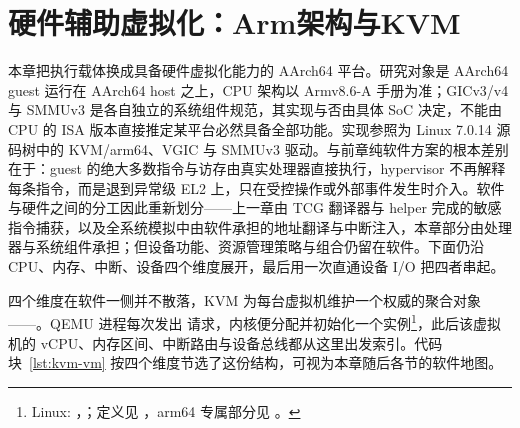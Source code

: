 \chapter{硬件辅助虚拟化：Arm架构与KVM}\label{sec:hardware}

本章把执行载体换成具备硬件虚拟化能力的 AArch64 平台。研究对象是 AArch64 guest 运行在 AArch64 host 之上，CPU 架构以 Armv8.6-A 手册为准；GICv3/v4 与 SMMUv3 是各自独立的系统组件规范，其实现与否由具体 SoC 决定，不能由 CPU 的 ISA 版本直接推定某平台必然具备全部功能\cite{source4,source9,source10}。实现参照为 Linux 7.0.14 源码树中的 KVM/arm64、VGIC 与 SMMUv3 驱动\cite{source5}。与前章纯软件方案的根本差别在于：guest 的绝大多数指令与访存由真实处理器直接执行，hypervisor 不再解释每条指令，而是退到异常级 EL2 上，只在受控操作或外部事件发生时介入。软件与硬件之间的分工因此重新划分——上一章由 TCG 翻译器与 helper 完成的敏感指令捕获，以及全系统模拟中由软件承担的地址翻译与中断注入，本章部分由处理器与系统组件承担；但设备功能、资源管理策略与组合仍留在软件。下面仍沿 CPU、内存、中断、设备四个维度展开，最后用一次直通设备 I/O 把四者串起。

四个维度在软件一侧并不散落，KVM 为每台虚拟机维护一个权威的聚合对象——。QEMU 进程每次发出  请求，内核便分配并初始化一个实例\footnote{Linux: ，；定义见 ，arm64 专属部分见 。}，此后该虚拟机的 vCPU、内存区间、中断路由与设备总线都从这里出发索引。代码块~\ref{lst:kvm-vm} 按四个维度节选了这份结构，可视为本章随后各节的软件地图。

